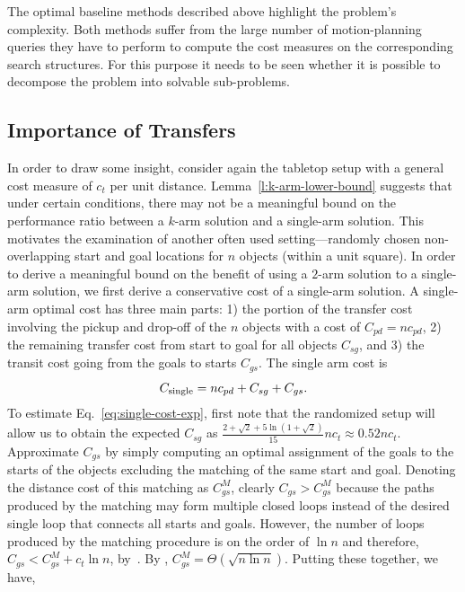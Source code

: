 
The optimal baseline methods described above highlight the problem's complexity. Both methods suffer from the large number of motion-planning queries they have to perform to compute the cost measures on the corresponding search structures. For this purpose it needs to be seen whether it is possible to decompose the problem into solvable sub-problems. 

\subsection{Importance of Transfers} In order to draw some insight, consider again the tabletop setup with a general cost measure of $c_t$ per unit distance.
Lemma~\ref{l:k-arm-lower-bound} suggests that under certain conditions, there 
may not be a meaningful bound on the performance ratio between a $k$-arm 
solution and a single-arm solution. This motivates the examination of another
often used setting---randomly chosen non-overlapping 
start and goal locations for $n$ objects (within a unit square). In order to derive a 
meaningful bound on the benefit of using a $2$-arm solution 
to a single-arm solution, we first derive a conservative cost of a single-arm solution. 
A single-arm optimal cost has three main parts: 1) the portion of the transfer cost involving the pickup and 
drop-off of the $n$ objects with a cost of $C_{pd} = nc_{pd}$, 2) the remaining transfer cost from 
start to goal for all objects $C_{sg}$, and 3) the transit cost 
going from the goals to starts $C_{gs}$. The single arm cost is  
\begin{equation}
\label{eq:single-cost-exp}
C_{\rm single} = nc_{pd} + C_{sg} + C_{gs}.
\end{equation}
To estimate Eq.~\ref{eq:single-cost-exp}, first note that the randomized setup 
will allow us to obtain the expected $C_{sg}$\cite{santalo2004integral} as
$\frac{2 + \sqrt{2} + 5\ln(1+\sqrt{2})}{15}nc_t \approx 0.52nc_t$.
Approximate $C_{gs}$ by simply computing an optimal assignment of the 
goals to the starts of the objects excluding the matching of the same start 
and goal. Denoting the distance cost of this matching as $C_{gs}^M$, clearly
$C_{gs} > C_{gs}^M$ because the paths produced by the matching may form 
multiple closed loops instead of the desired single loop that connects all 
starts and goals. However, the number of loops produced by the matching 
procedure is on the order of $\ln n$ and therefore, $C_{gs} < C_{gs}^M + 
c_t\ln n$, by~\cite{TrePavFra13}. By \cite{AjtKomTus84}, 
$C_{gs}^M = \Theta(\sqrt{n\ln n})$. Putting these together, we have,

